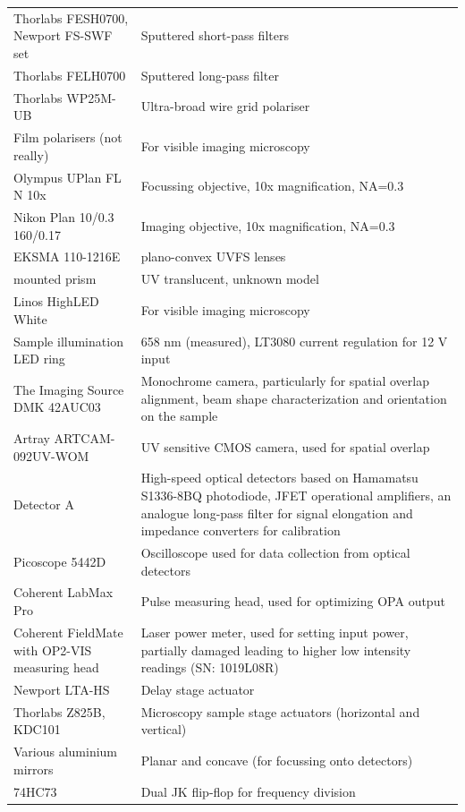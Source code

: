 \documentclass[twoside,openright]{scrreprt}
\begin{document}
{\begin{longtable}{p{}p{}}
    Thorlabs FESH0700, Newport FS-SWF set & Sputtered short-pass filters \\
    Thorlabs FELH0700 & Sputtered long-pass filter \\
    Thorlabs WP25M-UB & Ultra-broad wire grid polariser \\
    Film polarisers (not really) & For visible imaging microscopy \\
    Olympus UPlan FL N 10x & Focussing objective, 10x magnification, NA=0.3 \\
    Nikon Plan 10/0.3 160/0.17 & Imaging objective, 10x magnification, NA=0.3 \\
    EKSMA 110-1216E & plano-convex UVFS lenses\\
    mounted prism & UV translucent, unknown model\\
    Linos HighLED White & For visible imaging microscopy \\
    Sample illumination LED ring & 658 nm (measured), LT3080 current regulation for 12 V input \\
    The Imaging Source DMK 42AUC03 & Monochrome camera, particularly for spatial overlap alignment, beam shape characterization and orientation on the sample \\
    Artray ARTCAM-092UV-WOM & UV sensitive CMOS camera, used for spatial overlap\\
    Detector A & High-speed optical detectors based on Hamamatsu S1336-8BQ photodiode, JFET operational amplifiers, an analogue  long-pass filter for signal elongation and impedance converters for calibration \\
    Picoscope 5442D & Oscilloscope used for data collection from optical detectors \\
    Coherent LabMax Pro & Pulse measuring head, used for optimizing OPA output \\
    Coherent FieldMate with OP2-VIS measuring head & Laser power meter, used for setting input power, partially damaged leading to higher low intensity readings (SN: 1019L08R) \\
    Newport LTA-HS & Delay stage actuator \\
    Thorlabs Z825B, KDC101 & Microscopy sample stage actuators (horizontal and vertical) \\
    Various aluminium mirrors & Planar and concave (for focussing onto detectors) \\
    74HC73 & Dual JK flip-flop for frequency division
\end{longtable}
\begin{longtable}{p{}p{}}

\end{longtable}}
\end{document}

